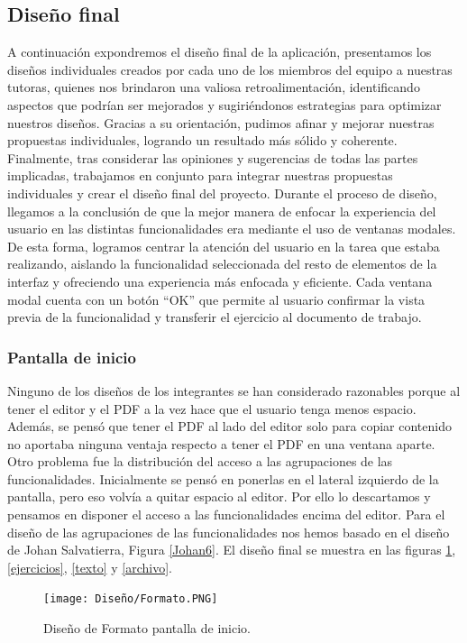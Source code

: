 \subsection{Diseño final}\label{subsec:DisenyoFinal}
A continuación expondremos el diseño final de la aplicación, presentamos los diseños individuales creados por cada uno de los miembros del equipo a nuestras tutoras, quienes nos brindaron una valiosa retroalimentación, identificando aspectos que podrían ser mejorados y sugiriéndonos estrategias para optimizar nuestros diseños. Gracias a su orientación, pudimos afinar y mejorar nuestras propuestas individuales, logrando un resultado más sólido y coherente. Finalmente, tras considerar las opiniones y sugerencias de todas las partes implicadas, trabajamos en conjunto para integrar nuestras propuestas individuales y crear el diseño final del proyecto. Durante el proceso de diseño, llegamos a la conclusión de que la mejor manera de enfocar la experiencia del usuario en las distintas funcionalidades era mediante el uso de ventanas modales. De esta forma, logramos centrar la atención del usuario en la tarea que estaba realizando, aislando la funcionalidad seleccionada del resto de elementos de la interfaz y ofreciendo una experiencia más enfocada y eficiente. Cada ventana modal cuenta con un botón ``OK'' que permite al usuario confirmar la vista previa de la funcionalidad y transferir el ejercicio al documento de trabajo.

\subsubsection{Pantalla de inicio}
Ninguno de los diseños de los integrantes se han considerado razonables porque al tener el editor y el PDF a la vez hace que el usuario tenga menos espacio. Además, se pensó que tener el PDF al lado del editor solo para copiar contenido no aportaba ninguna ventaja respecto a tener el PDF en una ventana aparte. Otro problema fue la distribución del acceso a las agrupaciones de las funcionalidades. Inicialmente se pensó en ponerlas en el lateral izquierdo de la pantalla, pero eso volvía a quitar espacio al editor. Por ello lo descartamos y pensamos en disponer el acceso a las funcionalidades encima del editor. Para el diseño de las agrupaciones de las funcionalidades nos hemos basado en el diseño de Johan Salvatierra, Figura \ref{Johan6}. El diseño final se  muestra en las figuras \ref{Forato}, \ref{ejercicios}, \ref{texto} y \ref{archivo}.

\begin{figure}[ht!]
  \centering
  \texttt{[image: Diseño/Formato.PNG]}
  \caption{Diseño de Formato pantalla de inicio.}
  \label{Forato}
\end{figure}

